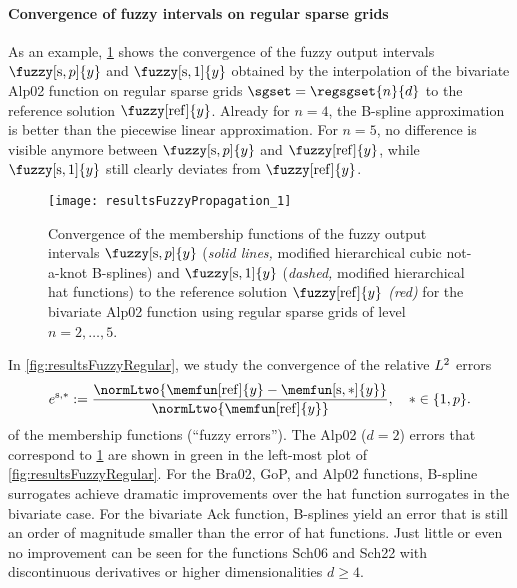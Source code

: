 \paragraph{Convergence of fuzzy intervals on regular sparse grids}

As an example,
\cref{fig:resultsFuzzyPropagation} shows the convergence of the
fuzzy output intervals $\fuzzy[\sparse,p]{y}$ and $\fuzzy[\sparse,1]{y}$
obtained by the interpolation of the
bivariate Alp02 function on regular sparse grids $\sgset = \regsgset{n}{d}$
to the reference solution $\fuzzy[\reference]{y}$.
Already for $n = 4$, the B-spline approximation is better than the
piecewise linear approximation.
For $n = 5$, no difference is visible anymore between $\fuzzy[\sparse,p]{y}$
and $\fuzzy[\reference]{y}$, while $\fuzzy[\sparse,1]{y}$ still clearly
deviates from $\fuzzy[\reference]{y}$.

\begin{SCfigure}
  \texttt{[image: resultsFuzzyPropagation\_1]}%
  \caption[Convergence of fuzzy output intervals]{%
    Convergence of the membership functions of the fuzzy output intervals
    $\fuzzy[\sparse,p]{y}$
    (\emph{solid lines,} modified hierarchical cubic not-a-knot B-splines)
    and $\fuzzy[\sparse,1]{y}$
    (\emph{dashed,} modified hierarchical hat functions)
    to the reference solution $\fuzzy[\reference]{y}$
    \emph{\textcolor{C1}{(red)}} for the bivariate Alp02 function using
    regular sparse grids of level $n = 2, \dotsc, 5$.%
  }%
  \label{fig:resultsFuzzyPropagation}%
\end{SCfigure}

In \cref{fig:resultsFuzzyRegular}, we study the convergence of the
relative $L^2$ errors
\begin{equation}
  e^{\sparse,\ast}
  := \frac{
    \normLtwo{\memfun[\reference]{y} - \memfun[\sparse,\ast]{y}}
  }{
    \normLtwo{\memfun[\reference]{y}}
  },\quad
  \ast \in \{1, p\}.
\end{equation}
of the membership functions (``fuzzy errors'').
The Alp02 ($d = 2$) errors
that correspond to \cref{fig:resultsFuzzyPropagation}
are shown in green in the left-most plot of \cref{fig:resultsFuzzyRegular}.
For the Bra02, GoP, and Alp02 functions, B-spline surrogates achieve
dramatic improvements over the hat function surrogates in the bivariate case.
For the bivariate Ack function, B-splines yield an error that
is still an order of magnitude smaller than the error of hat functions.
Just little or even no improvement can be seen
for the functions Sch06 and Sch22 with discontinuous derivatives or
higher dimensionalities $d \ge 4$.

